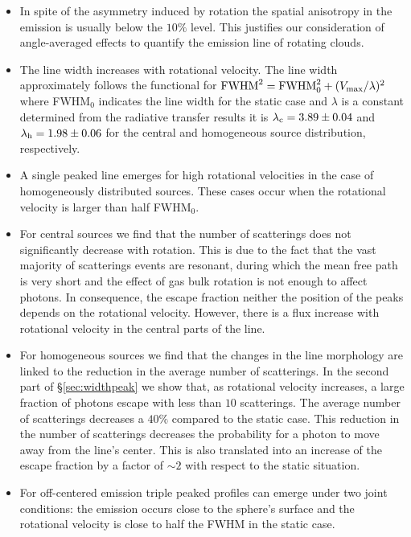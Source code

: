 \documentclass{emulateapj}
\newcommand{\ly}{{\ifmmode{{\rm Ly}\alpha~}\else{Ly$\alpha$~}\fi}}
\begin{document}
\begin{itemize}

\item In spite of the asymmetry induced by rotation the spatial
  anisotropy in the emission is usually below the
  $10\%$ level. This justifies our consideration of angle-averaged
  effects to quantify the emission line of rotating clouds. 

\item The line width increases with rotational velocity. The line width
  approximately follows the functional for  ${\rm FWHM}^2 = {\rm FWHM}_{
    0}^2 + (V_{\rm max}/\lambda)^2$ where FWHM$_{0}$ indicates the line
  width for the static case and $\lambda$ is a constant determined from
  the radiative transfer results it is $\lambda_{\rm c}=3.89\pm0.04$ and
  $\lambda_{\rm h}=1.98\pm0.06$ for the central and homogeneous source
  distribution, respectively.

\item A single peaked line emerges for high rotational velocities in
  the case of homogeneously distributed sources. These cases occur when
  the rotational velocity is larger than half FWHM$_0$.  

\item For central sources we find that the number of scatterings
does not significantly decrease with rotation. This is due to the 
fact that the vast majority of scatterings events are resonant, 
during which the mean free path is very short and the effect of gas
bulk rotation is not enough to affect \ly photons. In consequence, 
the escape fraction neither the position of the peaks depends on the
rotational velocity. However, there is a flux increase with rotational
velocity in the central parts of the line.


\item For homogeneous sources we find that the changes in the
line morphology are linked to the reduction in the average number of
scatterings. In the second part of \S \ref{sec:widthpeak} we show
that, as rotational velocity increases, a large fraction of photons
escape with less than $10$ scatterings. The average number of
scatterings decreases a $40\%$ compared to the static case. 
This reduction in the number of scatterings decreases the probability
for a photon to move away from the line's center. This is also
translated into an increase of the escape fraction by a factor of
$\sim 2$ with respect to the static situation.



\item For off-centered emission triple peaked profiles can emerge
  under two joint conditions: the emission occurs close to the sphere's
  surface and the rotational velocity is close to half the FWHM in the
  static case.   
\end{itemize}
\end{document}
